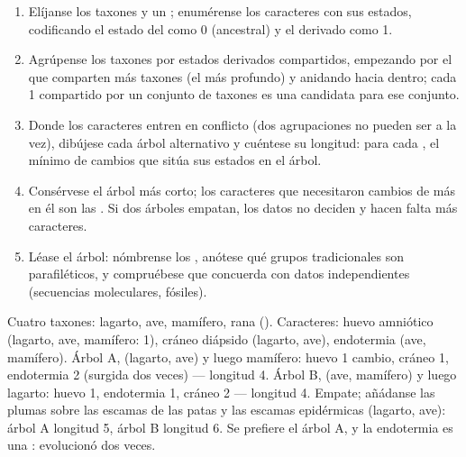 \begin{method}\label{met:b1:classifying-biodiversity:cladogram}
\begin{enumerate}
  \item Elíjanse los taxones y un ; enumérense los caracteres
        con sus estados, codificando el estado del  como 0
        (ancestral) y el derivado como 1.
  \item Agrúpense los taxones por estados derivados compartidos, empezando
        por el  que comparten más taxones (el  más profundo) y
        anidando hacia dentro; cada 1 compartido por un conjunto de taxones
        es una  candidata para ese conjunto.
  \item Donde los caracteres entren en conflicto (dos agrupaciones no pueden
        ser  a la vez), dibújese cada árbol alternativo y cuéntese su
        longitud: para cada , el mínimo de cambios que sitúa sus
        estados en el árbol.
  \item Consérvese el árbol más corto; los caracteres que necesitaron
        cambios de más en él son las . Si dos árboles empatan,
        los datos no deciden y hacen falta más caracteres.
  \item Léase el árbol: nómbrense los , anótese qué grupos
        tradicionales son parafiléticos, y compruébese que concuerda con
        datos independientes (secuencias moleculares, fósiles).
\end{enumerate}
\end{method}

\begin{example}\label{ex:b1:classifying-biodiversity:count}
Cuatro taxones: lagarto, ave, mamífero, rana (). Caracteres:
huevo amniótico (lagarto, ave, mamífero: 1), cráneo diápsido (lagarto,
ave), endotermia (ave, mamífero). Árbol A, (lagarto, ave) y luego mamífero:
huevo 1 cambio, cráneo 1, endotermia 2 (surgida dos veces) --- longitud 4.
Árbol B, (ave, mamífero) y luego lagarto: huevo 1, endotermia 1, cráneo 2
--- longitud 4. Empate; añádanse las plumas sobre las escamas de las patas y
las escamas epidérmicas (lagarto, ave): árbol A longitud 5, árbol B longitud
6. Se prefiere el árbol A, y la endotermia es una : evolucionó dos
veces.
\end{example}

